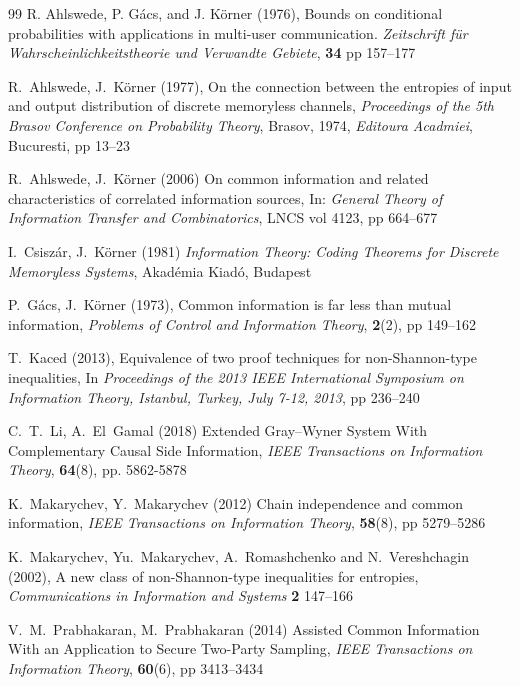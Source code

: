 \documentclass{IEEEtran}
\begin{document}
\begin{thebibliography}{99}
R. Ahlswede, P. Gács, and J. Körner (1976),
Bounds on conditional probabilities with applications in multi-user communication.
\emph{Zeitschrift für Wahrscheinlichkeitstheorie und Verwandte Gebiete}, 
{\bf 34} pp 157--177

R.~Ahlswede, J.~K\"orner (1977),
\newblock
On the connection between the entropies of input and output distribution of
discrete memoryless channels,
\newblock
\emph{Proceedings of the 5th Brasov Conference on Probability Theory},
Brasov, 1974, \emph{Editoura Acadmiei}, Bucuresti, pp 13--23

R.~Ahlswede, J.~K\"orner (2006)
On common information and related characteristics of correlated information
sources,
In: \emph{General Theory of Information Transfer and Combinatorics}, 
LNCS vol 4123, pp 664--677

I.~Csisz\'ar, J.~K\"orner (1981)
\emph{Information Theory: Coding Theorems for Discrete Memoryless Systems},
Akad\'emia Kiad\'o, Budapest

P.~G\'acs, J.~K\"orner (1973), 
Common information is far less than mutual information,
\emph{Problems of Control and Information Theory}, {\bf 2}(2), pp 149--162

T.~Kaced (2013),
Equivalence of two proof techniques for non-Shannon-type inequalities,
In \emph{Proceedings of the 2013 {IEEE} International Symposium on Information
                  Theory, Istanbul, Turkey, July 7-12, 2013},
  pp 236--240

C.~T.~Li, A.~El~Gamal (2018)
Extended Gray–Wyner System With Complementary Causal Side Information,
\emph{IEEE Transactions on Information Theory}, {\bf64}(8), pp. 5862-5878

K.~Makarychev, Y.~Makarychev (2012)
Chain independence and common information,
\emph{IEEE Transactions on Information Theory}, {\bf58}(8), pp 5279--5286

K.~Makarychev, Yu.~Makarychev, A.~Romashchenko and N.~Vereshchagin (2002),
A new class of non-Shannon-type inequalities for entropies,
\emph{Communications in Information and Systems} {\bf 2} 147--166

V.~M.~Prabhakaran, M.~Prabhakaran (2014)
Assisted Common Information With an Application to Secure Two-Party
                  Sampling,
\emph{IEEE Transactions on Information Theory}, {\bf60}(6), pp 3413--3434


\end{thebibliography}
\end{document}
